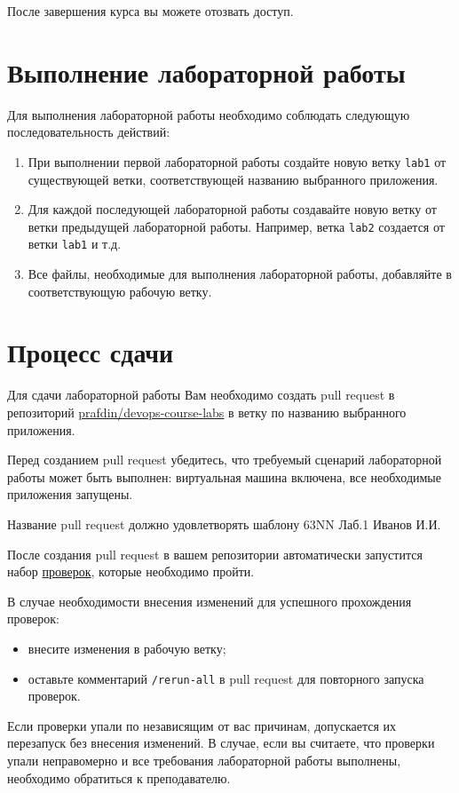 \documentclass[12pt,a4paper]{article}
\begin{document}
После завершения курса вы можете отозвать доступ.


\section{Выполнение лабораторной работы}
Для выполнения лабораторной работы необходимо соблюдать следующую последовательность действий:

\begin{enumerate}
    \item При выполнении первой лабораторной работы создайте новую ветку \texttt{lab1} от существующей ветки, соответствующей названию выбранного приложения.
    \item Для каждой последующей лабораторной работы создавайте новую ветку от ветки предыдущей лабораторной работы. Например, ветка \texttt{lab2} создается от ветки \texttt{lab1} и т.д.
    \item Все файлы, необходимые для выполнения лабораторной работы, добавляйте в соответствующую рабочую ветку.
\end{enumerate}

\section{Процесс сдачи}
Для сдачи лабораторной работы Вам необходимо создать pull request в репозиторий \href{https://github.com/prafdin/devops-course-labs}{prafdin/devops-course-labs}
в ветку по названию выбранного приложения.

Перед созданием pull request убедитесь, что требуемый сценарий лабораторной работы может быть выполнен:
виртуальная машина включена, все необходимые приложения запущены.

Название pull request должно удовлетворять шаблону 63NN Лаб.1 Иванов И.И.

После создания pull request в вашем репозитории автоматически запустится набор \href{https://github.com/prafdin/check-assignment/tree/main/scripts}{проверок},
которые необходимо пройти.

В случае необходимости внесения изменений для успешного прохождения проверок:
\begin{itemize}
    \item внесите изменения в рабочую ветку;
    \item оставьте комментарий \texttt{/rerun-all} в pull request для повторного запуска проверок.
\end{itemize}

Если проверки упали по независящим от вас причинам, допускается их перезапуск без внесения изменений.
В случае, если вы считаете, что проверки упали неправомерно и все требования лабораторной работы выполнены, необходимо обратиться к преподавателю.
\end{document}
